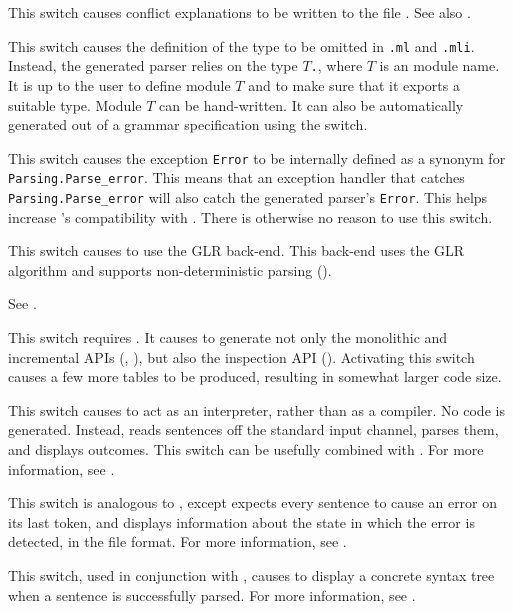 \documentclass[onecolumn,11pt,nocopyrightspace,preprint]{sigplanconf}
\begin{document}
\docswitch{\oexplain} This switch causes conflict explanations to be
written  to the file \conflicts. See also .

 This switch causes the definition of
the \token type to be omitted in \texttt{.ml} and
\texttt{.mli}. Instead, the generated parser relies on
the type $T$\texttt{.}\token, where $T$ is an \ocaml module name. It is up to
the user to define module $T$ and to make sure that it exports a suitable
\token type. Module $T$ can be hand-written. It can also be automatically generated
out of a grammar specification using the \oonlytokens switch.

\docswitch{\ofixedexc} This switch causes the exception \texttt{Error} to be
internally defined as a synonym for \texttt{Parsing.Parse\_error}. This means
that an exception handler that catches \texttt{Parsing.Parse\_error} will also
catch the generated parser's \texttt{Error}. This helps increase \menhir's
compatibility with \ocamlyacc. There is otherwise no reason to use this switch.

\docswitch{\oGLR} This switch causes \menhir to use the GLR back-end.
This back-end uses the GLR algorithm and supports non-deterministic
parsing ().

\docswitch{\oinfer, \oinferwrite, \oinferread} See .

\docswitch{\oinspection} This switch requires \otable. It causes \menhir to generate
not only the monolithic and incremental APIs (,
), but also the inspection API ().
Activating this switch causes a few more tables to be produced, resulting in
somewhat larger code size.

\docswitch{\ointerpret} This switch causes \menhir to act as an interpreter,
rather than as a compiler. No \ocaml code is generated. Instead, \menhir
reads sentences off the standard input channel, parses them, and displays
outcomes. This switch can be usefully combined with \otrace.
For more information, see .

\docswitch{\ointerpreterror} This switch is analogous to \ointerpret, except
\menhir expects every sentence to cause an error on its last token, and
displays information about the state in which the error is detected, in
the \messages file format. For more information, see .

\docswitch{\ointerpretshowcst} This switch, used in conjunction with \ointerpret,
causes \menhir to display a concrete syntax tree when a sentence is successfully
parsed. For more information, see .
\end{document}

